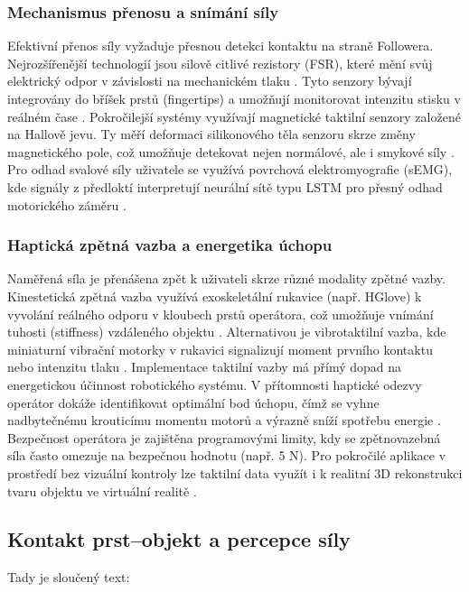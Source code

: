 \subsubsection{Mechanismus přenosu a snímání síly}
Efektivní přenos síly vyžaduje přesnou detekci kontaktu na straně Followera. Nejrozšířenější technologií jsou silově citlivé rezistory (FSR), které mění svůj elektrický odpor v závislosti na mechanickém tlaku \cite{Nyrobtseva2018, Trajlinek2021}. Tyto senzory bývají integrovány do bříšek prstů (fingertips) a umožňují monitorovat intenzitu stisku v reálném čase \cite{Trajlinek2021}. Pokročilejší systémy využívají magnetické taktilní senzory založené na Hallově jevu. Ty měří deformaci silikonového těla senzoru skrze změny magnetického pole, což umožňuje detekovat nejen normálové, ale i smykové síly \cite{GIUDICI2025}. Pro odhad svalové síly uživatele se využívá povrchová elektromyografie (sEMG), kde signály z předloktí interpretují neurální sítě typu LSTM pro přesný odhad motorického záměru \cite{Sun2023}.
\subsubsection{Haptická zpětná vazba a energetika úchopu}
Naměřená síla je přenášena zpět k uživateli skrze různé modality zpětné vazby. Kinestetická zpětná vazba využívá exoskeletální rukavice (např. HGlove) k vyvolání reálného odporu v kloubech prstů operátora, což umožňuje vnímání tuhosti (stiffness) vzdáleného objektu \cite{GIUDICI2025}. Alternativou je vibrotaktilní vazba, kde miniaturní vibrační motorky v rukavici signalizují moment prvního kontaktu nebo intenzitu tlaku \cite{Papakonstantinou20251218, Trajlinek2021}.
Implementace taktilní vazby má přímý dopad na energetickou účinnost robotického systému. V přítomnosti haptické odezvy operátor dokáže identifikovat optimální bod úchopu, čímž se vyhne nadbytečnému krouticímu momentu motorů a výrazně sníží spotřebu energie \cite{Papakonstantinou20251218}. Bezpečnost operátora je zajištěna programovými limity, kdy se zpětnovazebná síla často omezuje na bezpečnou hodnotu (např. 5 N). Pro pokročilé aplikace v prostředí bez vizuální kontroly lze taktilní data využít i k realitní 3D rekonstrukci tvaru objektu ve virtuální realitě \cite{GIUDICI2025}.

\subsection{Kontakt prst–objekt a percepce síly}
Tady je sloučený text:

